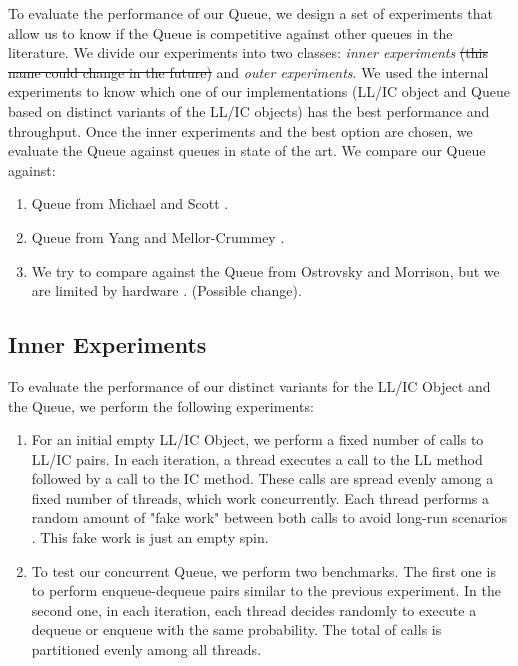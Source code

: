 To evaluate the performance of our Queue, we design a set of experiments that allow us to know if the Queue is competitive against other queues in the literature. We divide our experiments into two classes: \emph{inner experiments} \sout{(this name could change in the future)} and \emph{outer experiments}. We used the internal experiments to know which one of our implementations (LL/IC object and Queue based on distinct variants of the LL/IC objects) has the best performance and throughput. Once the inner experiments and the best option are chosen, we evaluate the Queue against queues in state of the art. We compare our Queue against:

\begin{enumerate}
\item Queue from Michael and Scott \cite{DBLP_conf_podc_MichaelS96}.
\item Queue from Yang and Mellor-Crummey \cite{DBLP_conf_ppopp_YangM16}.
\item We try to compare against the Queue from Ostrovsky and Morrison, but we are limited by hardware \cite{scalingconcurrent2020}. (Possible change).
\end{enumerate}



\subsection{Inner Experiments}
\label{sec:org4649774}

To evaluate the performance of our distinct variants for the LL/IC Object
and the Queue, we perform the following experiments:

\begin{enumerate}
\item For an initial empty LL/IC Object, we perform a fixed number of calls to
LL/IC pairs. In each iteration, a thread executes a call to the LL method
followed by a call to the IC method. These calls are spread evenly among
a fixed number of threads, which work concurrently. Each thread performs
a random amount of "fake work" between both calls to avoid long-run
scenarios
\cite{DBLP_conf_ppopp_YangM16,DBLP_conf_podc_MichaelS96}. This fake
work is just an empty spin.
\item To test our concurrent Queue, we perform two benchmarks. The first one is
to perform enqueue-dequeue pairs similar to the previous experiment. In
the second one, in each iteration, each thread decides randomly to
execute a dequeue or enqueue with the same probability. The total of
calls is partitioned evenly among all threads.
\end{enumerate}


